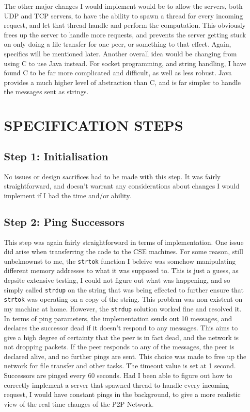 \documentclass[a4paper,11pt]{article}
\newcommand{\code}{\texttt}
\begin{document}
\bigbreak

\noindent The other major changes I would implement would be to allow the servers, both UDP and TCP servers, to have the ability to spawn a thread for every incoming request, and let that thread handle and perform the computation. This obviously frees up the server to handle more requests, and prevents the server getting stuck on only doing a file transfer for one peer, or something to that effect. Again, specifics will be mentioned later. Another overall idea would be changing from using C to use Java instead. For socket programming, and string handling, I have found C to be far more complicated and difficult, as well as less robust. Java provides a much higher level of abstraction than C, and is far simpler to handle the messages sent as strings.

\pagebreak

\section{SPECIFICATION STEPS}
\subsection*{Step 1: Initialisation}
No issues or design sacrifices had to be made with this step. It was fairly straightforward, and doesn't warrant any considerations about changes I would implement if I had the time and/or ability.

\subsection*{Step 2: Ping Successors}
This step was again fairly straightforward in terms of implementation. One issue did arise when transferring the code to the CSE machines. For some reason, still unbeknownst to me, the \code{strtok} function I beleive was somehow manipulating different memory addresses to what it was supposed to. This is just a guess, as depsite extensive testing, I could not figure out what was happening, and so simply called \code{strdup} on the string that was being effected to further ensure that \code{strtok} was operating on a copy of the string. This problem was non-existent on my machine at home. However, the \code{strdup} solution worked fine and resolved it. In terms of ping parameters, the implementation sends out 10 messages, and declares the successor dead if it doesn't respond to any messages. This aims to give a high degree of certainty that the peer is in fact dead, and the network is not dropping packets. If the peer responds to any of the messages, the peer is declared alive, and no further pings are sent. This choice was made to free up the network for file transfer and other tasks. The timeout value is set at 1 second. Successors are pinged every 60 seconds. Had I been able to figure out how to correctly implement a server that spawned thread to handle every incoming request, I would have constant pings in the background, to give a more realistic view of the real time changes of the P2P Network.
\end{document}
